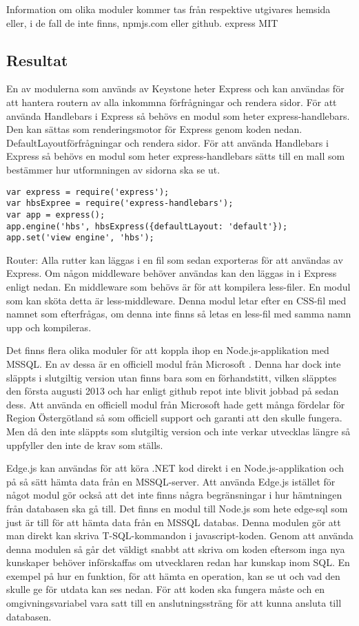 Information om olika moduler kommer tas från respektive utgivares hemsida eller, i de fall de inte finns, npmjs.com eller github.
express MIT

\subsection{Resultat}
En av modulerna som används av Keystone heter Express och kan användas för att hantera routern \cite{expressRouter} av alla inkommna förfrågningar och rendera sidor. För att använda Handlebars i Express så behövs en modul som heter express-handlebars. Den kan sättas som renderingsmotor för Express genom koden nedan. DefaultLayoutförfrågningar och rendera sidor. För att använda Handlebars i Express så behövs en modul som heter express-handlebars sätts till en mall som bestämmer hur utformningen av sidorna ska se ut.  
\begin{verbatim}
var express = require('express');
var hbsExpree = require('express-handlebars');
var app = express();
app.engine('hbs', hbsExpress({defaultLayout: 'default'});
app.set('view engine', 'hbs');
\end{verbatim}
Router:
Alla rutter kan läggas i en fil som sedan exporteras för att användas av Express. Om någon middleware behöver användas kan den läggas in i Express enligt nedan. En middleware som behövs är för att kompilera less-filer. En modul som kan sköta detta är less-middleware. Denna modul letar efter en CSS-fil med namnet som efterfrågas, om denna inte finns så letas en less-fil med samma namn upp och kompileras.  



Det finns flera olika moduler för att koppla ihop en Node.js-applikation med MSSQL. En av dessa är en officiell modul från Microsoft \cite{sqlMS}. Denna har dock inte släppts i slutgiltig version utan finns bara som en förhandstitt, vilken släpptes den första augusti 2013 och har enligt github repot inte blivit jobbad på sedan dess. Att använda en officiell modul från Microsoft hade gett många fördelar för Region Östergötland så som officiell support och garanti att den skulle fungera. Men då den inte släppts som slutgiltig version och inte verkar utvecklas längre så uppfyller den inte de krav som ställs.

Edge.js kan användas för att köra .NET kod direkt i en Node.js-applikation och på så sätt hämta data från en MSSQL-server. Att använda Edge.js istället för något modul gör också att det inte finns några begränsningar i hur hämtningen från databasen ska gå till. Det finns en modul till Node.js som hete edge-sql som just är till för att hämta data från en MSSQL databas. Denna modulen gör att man direkt kan skriva T-SQL-kommandon i javascript-koden. Genom att använda denna modulen så går det väldigt snabbt att skriva om koden eftersom inga nya kunskaper behöver införskaffas om utvecklaren redan har kunskap inom SQL. En exempel på hur en funktion, för att hämta en operation, kan se ut och vad den skulle ge för utdata kan ses nedan. För att koden ska fungera måste och en omgivningsvariabel vara satt till en anslutningssträng för att kunna ansluta till databasen. 

